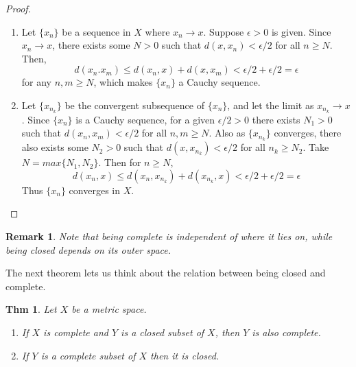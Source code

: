 \documentclass[paper=a4, fontsize=11pt]{scrartcl}
\newtheorem{theorem}{Thm}
\newtheorem*{remark}{Remark}
\begin{document}
\begin{proof}
$ $ \newline
\vspace{-0.15in}
\begin{enumerate}
	\item Let $\{x_n\}$ be a sequence in $X$ where $x_n \to x$. Suppose $\epsilon >0$ is given. Since $x_n \to x$, there exists some $N>0$ such that $d(x,x_n)<\epsilon/2$ for all $n \geq N$. Then,
	\begin{equation}\nonumber
		d(x_n.x_m) \leq d(x_n,x) + d(x,x_m) < \epsilon/2 + \epsilon/2 = \epsilon
	\end{equation}
	for any $n,m \geq N$, which makes $\{x_n\}$ a Cauchy sequence.
	\item Let $\{x_{n_k}\}$ be the convergent subsequence of $\{x_n\}$, and let the limit as $x_{n_k} \to x$. Since $\{x_n\}$ is a Cauchy sequence, for a given $\epsilon/2 >0$ there exists $N_1>0$ such that $d(x_n,x_m)<\epsilon/2$ for all $n,m \geq N$. Also as $\{x_{n_k}\}$ converges, there also exists some $N_2>0$ such that $d(x,x_{n_k})<\epsilon/2$ for all $n_k \geq N_2$. Take $N=max\{N_1,N_2\}$. Then for $n\geq N$,
	\begin{equation}\nonumber
		d(x_n,x) \leq d(x_n,x_{n_k}) + d(x_{n_k},x) < \epsilon/2 + \epsilon/2 = \epsilon
	\end{equation}
	Thus $\{x_n\}$ converges in $X$.
\end{enumerate}
\end{proof}

\begin{remark}
	Note that being complete is independent of where it lies on, while being closed depends on its outer space.\\
\end{remark}

The next theorem lets us think about the relation between being closed and complete.\\

\begin{theorem} Let $X$ be a metric space.
$ $ \newline
\vspace{-0.15in}
	\begin{enumerate}
		\item If $X$ is complete and $Y$ is a closed subset of $X$, then $Y$ is also complete.
		\item If $Y$ is a complete subset of $X$ then it is closed.\\
	\end{enumerate}
\end{theorem}
\end{document}
